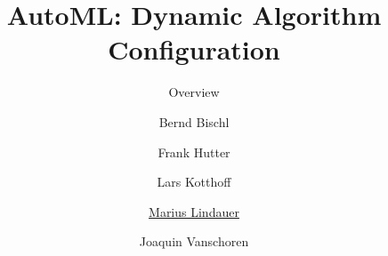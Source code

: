 




\title[AutoML: Overview]{AutoML: Dynamic Algorithm Configuration}
\subtitle{Overview}
\author[Marius Lindauer]{Bernd Bischl \and Frank Hutter \and Lars Kotthoff\newline \and \underline{Marius Lindauer} \and Joaquin Vanschoren}
\institute{}
\date{}





	
	\maketitle
	

